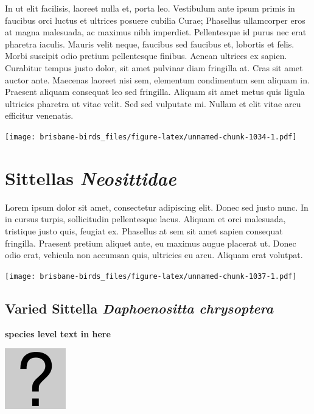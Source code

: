 \documentclass[]{book}
\let\origfigure\figure
\let\endorigfigure\endfigure
\renewenvironment{figure}[1][2] {
  \expandafter\origfigure\expandafter[H]
} {
  \endorigfigure
}
\begin{document}
In ut elit facilisis, laoreet nulla et, porta leo. Vestibulum ante ipsum
primis in faucibus orci luctus et ultrices posuere cubilia Curae;
Phasellus ullamcorper eros at magna malesuada, ac maximus nibh
imperdiet. Pellentesque id purus nec erat pharetra iaculis. Mauris velit
neque, faucibus sed faucibus et, lobortis et felis. Morbi suscipit odio
pretium pellentesque finibus. Aenean ultrices ex sapien. Curabitur
tempus justo dolor, sit amet pulvinar diam fringilla at. Cras sit amet
auctor ante. Maecenas laoreet nisi sem, elementum condimentum sem
aliquam in. Praesent aliquam consequat leo sed fringilla. Aliquam sit
amet metus quis ligula ultricies pharetra ut vitae velit. Sed sed
vulputate mi. Nullam et elit vitae arcu efficitur venenatis.

\begin{figure}
\centering
\texttt{[image: brisbane-birds\_files/figure-latex/unnamed-chunk-1034-1.pdf]}
\caption{\label{fig:unnamed-chunk-1034}insert figure caption}
\end{figure}

\chapter{\texorpdfstring{Sittellas
\emph{Neosittidae}}{Sittellas Neosittidae}}\label{sittellas-neosittidae}

Lorem ipsum dolor sit amet, consectetur adipiscing elit. Donec sed justo
nunc. In in cursus turpis, sollicitudin pellentesque lacus. Aliquam et
orci malesuada, tristique justo quis, feugiat ex. Phasellus at sem sit
amet sapien consequat fringilla. Praesent pretium aliquet ante, eu
maximus augue placerat ut. Donec odio erat, vehicula non accumsan quis,
ultricies eu arcu. Aliquam erat volutpat.

\texttt{[image: brisbane-birds\_files/figure-latex/unnamed-chunk-1037-1.pdf]}

\section{\texorpdfstring{Varied Sittella \emph{Daphoenositta
chrysoptera}}{Varied Sittella Daphoenositta chrysoptera}}\label{varied-sittella-daphoenositta-chrysoptera}

\textbf{species level text in here}

\begin{figure}
\centering
\includegraphics{assets/missing.png}
\caption{No image for species}
\end{figure}
\end{document}
